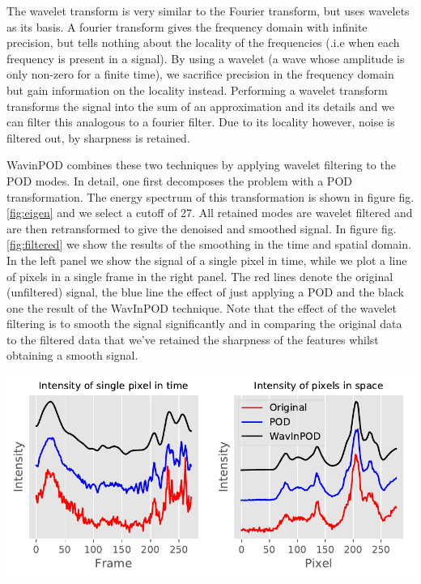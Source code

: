 \documentclass[12pt,a4paper,]{Dissertate}
\let\origfigure\figure
\let\endorigfigure\endfigure
\renewenvironment{figure}[1][2] {
    \expandafter\origfigure\expandafter[H]
} {
    \endorigfigure
}
\begin{document}
The wavelet transform is very similar to the Fourier transform, but uses
wavelets as its basis. A fourier transform gives the frequency domain
with infinite precision, but tells nothing about the locality of the
frequencies (.i.e when each frequency is present in a signal). By using
a wavelet (a wave whose amplitude is only non-zero for a finite time),
we sacrifice precision in the frequency domain but gain information on
the locality instead. Performing a wavelet transform transforms the
signal into the sum of an approximation and its details and we can
filter this analogous to a fourier filter. Due to its locality however,
noise is filtered out, by sharpness is retained.

WavinPOD combines these two techniques by applying wavelet filtering to
the POD modes. In detail, one first decomposes the problem with a POD
transformation. The energy spectrum of this transformation is shown in
figure fig.\ref{fig:eigen} and we select a cutoff of 27. All retained
modes are wavelet filtered and are then retransformed to give the
denoised and smoothed signal. In figure fig.\ref{fig:filtered} we show
the results of the smoothing in the time and spatial domain. In the left
panel we show the signal of a single pixel in time, while we plot a line
of pixels in a single frame in the right panel. The red lines denote the
original (unfiltered) signal, the blue line the effect of just applying
a POD and the black one the result of the WavInPOD technique. Note that
the effect of the wavelet filtering is to smooth the signal
significantly and in comparing the original data to the filtered data
that we've retained the sharpness of the features whilst obtaining a
smooth signal.

\begin{figure}
\hypertarget{fig:filtered}{%
\centering
\includegraphics{source/figures/pdf/filtered.pdf}
\caption{Effect of POD with a cutoff of 27 and wavelet filtering with a
level 3 db4 wavelet. Left panel shows the result in the time domain,
right panel in the spatial domain. Lines have been offset for
clarity.}\label{fig:filtered}
}
\end{figure}
\end{document}
